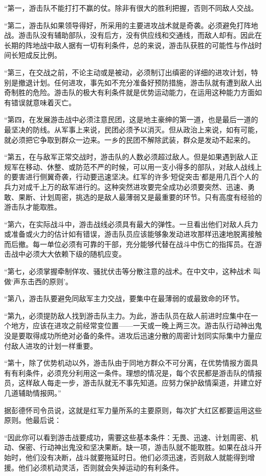 \documentclass[10pt]{book}
\begin{document}
“第一，游击队不能打打不赢的仗。除非有很大的胜利把握，否则不同敌人交战。

“第二，游击队如果领导得好，所采用的主要进攻战术就是奇袭。必须避免打阵地战。游击队没有辅助部队，没有后方，没有供应线和交通线，而敌人却有。因此在长期的阵地战中敌人据有一切有利条件，总的来说，游击队获胜的可能性与作战时间长短成反比例。

“第三，在交战之前，不论主动或是被动，必须制订出缜密的详细的进攻计划，特别是撤退计划。任何进攻，事先如不充分准备好预防措施，游击队就有遭到敌人出奇制胜的危险。游击队的极大有利条件就是优势运动能力，在运用这种能力方面如有错误就意味着灭亡。

“第四，在发展游击战中必须注意民团，这是地主豪绅的第一道，也是最后一道的最坚决的防线。从军事上来说，民团必须予以消灭。但从政治上来说，如有可能，就必须把它争取到群众一边来。一乡的民团不解除武装，群众是发动不起来的。

“第五，在与敌军正常交战时，游击队的人数必须超过敌人。但是如果遇到敌人正规军在移动、休整、或防范不严的时候，可以用一支小得多的部队，对敌人战线上的要害进行侧翼奇袭，行动要迅速坚决。红军的许多‘短促突击’都是用几百个人的兵力对成千上万的敌军进行的。这种突然进攻要完全成功必须要突然、迅速、勇敢、果断、计划周密，挑选的是敌人最薄弱又是最重要的环节。只有高度有经验的游击队才能取胜。

“第六，在实际战斗中，游击战线必须具有最大的弹性。一旦看出他们对敌人兵力或准备或火力的估计如有错误，游击队员应该能够象发动进攻那样迅速地脱离接触而后撤。每一单位必须有可靠的干部，充分能够代替在战斗中伤亡的指挥员。在游击战中必须大大依赖下级的随机应变。

“第七，必须掌握牵制佯攻、骚扰伏击等分散注意的战术。在中文中，这种战术 叫做‘声东击西的原则’。

“第八，游击队要避免同敌军主力交战，要集中在最薄弱的或最致命的环节。

“第九，必须提防敌人找到游击队主力。为此，游击队员在敌人前进时应集中在一个地方，应该在进攻之前经常变位置——一天或一晚上两三次。游击队行动神出鬼没是要取得成功所绝对必备的条件。进攻后迅速分散的周密计划同实际集中力量应付敌人进攻的计划一样重要。

“第十，除了优势机动以外，游击队由于同地方群众不可分离，在优势情报方面具有有利条件，必须充分利用这一条件。理想的情况是，每个农民都是游击队的情报员，这样敌人每走一步，游击队就无不事先知道。应努力保护敌情渠道，并建立好几道辅助情报网。”

据彭德怀司令员说，这就是红军力量所系的主要原则，每次扩大红区都要运用这些原则。他最后说：

“因此你可以看到游击战要成功，需要这些基本条件：无畏、迅速、计划周密、机动、保密、行动神出鬼没和坚决果断。缺一项，游击队就不能取胜。如果在战斗开始时，他们没有决断，战斗就要拖延时日。他们必须迅速，否则敌人就能得到增援。他们必须机动灵活，否则就会失掉运动的有利条件。
\end{document}
